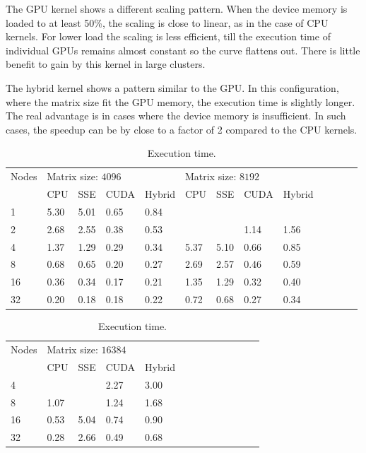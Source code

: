 The GPU kernel shows a different scaling pattern. When the device memory is loaded to at least 50\%, the scaling is close to linear, as in the case of CPU kernels. For lower load the scaling is less efficient, till the execution time of individual GPUs remains almost constant so the curve flattens out. There is little benefit to gain by this kernel in large clusters.

The hybrid kernel shows a pattern similar to the GPU. In this configuration, where the matrix size fit the GPU memory, the execution time is slightly longer. The real advantage is in cases where the device memory is insufficient. In such cases, the speedup can be by close to a factor of 2 compared to the CPU kernels.

\begin{table}
\centering
\begin{tabular}{*{13}{l}}
\hline
Nodes & \multicolumn{4}{l}{Matrix size: $4096$} & \multicolumn{4}{l}{Matrix size: $8192$} \\
 & CPU & SSE & CUDA & Hybrid & CPU & SSE & CUDA & Hybrid \\
\hline
1 & 5.30 & 5.01 & 0.65 & 0.84 &  & & & \\
2 & 2.68 & 2.55 & 0.38 & 0.53 &  & & 1.14 & 1.56 \\
4 & 1.37 & 1.29 & 0.29 & 0.34 & 5.37 & 5.10 & 0.66 & 0.85 \\
8 & 0.68 & 0.65 & 0.20 & 0.27 & 2.69 & 2.57 & 0.46 & 0.59 \\
16& 0.36 & 0.34 & 0.17 & 0.21 & 1.35 & 1.29 & 0.32 & 0.40 \\
32& 0.20 & 0.18 & 0.18 & 0.22 & 0.72 & 0.68 & 0.27 & 0.34 \\
\hline
\end{tabular}

\vspace*{0.5 cm}

\begin{tabular}{*{13}{l}}
\hline
Nodes & \multicolumn{4}{l}{Matrix size: $16384$} \\
 & CPU & SSE & CUDA & Hybrid \\
\hline
4 &  &  & 2.27 & 3.00 \\
8 & 1.07 &  & 1.24 & 1.68 \\
16& 0.53 & 5.04 & 0.74 & 0.90 \\
32& 0.28 & 2.66 & 0.49 & 0.68 \\
\hline
\end{tabular} \caption{Execution time.} \label{tab:bench-time}
\end{table}

